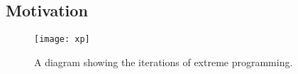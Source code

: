 \documentclass[../main.tex]{subfiles}
\begin{document}
\subsection{Motivation}
\blindtext
    
\begin{figure}[ht]
    \centering
        \texttt{[image: xp]}
    \caption{A diagram showing the iterations of extreme programming.}
\end{figure}
    
\blindtext
\end{document}
